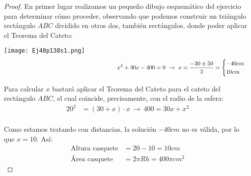\begin{proof} En primer lugar realizamos un pequeño dibujo esquemático del ejercicio para determinar cómo proceder, observando que podemos construir un triángulo rectángulo $ABC$ dividido en otros dos, también rectángulos, donde poder aplicar el Teorema del Cateto:

\begin{multicols}{2}
		
		\begin{center}
		\texttt{[image: Ej40p138s1.png]}
		\vspace{-2cm}
		\begin{align*}
				\hspace{6.85cm}x^2&+30x-400=0 \ \rightarrow \ x=\dfrac{-30\pm50}{2}=\begin{cases}-40cm\\ 10cm\end{cases}\\
			\end{align*}
	\end{center}
				
	\columnbreak
	
	\begin{minipage}{7cm}
			Para calcular $x$ bastará aplicar el Teorema del Cateto para el cateto del rectángulo $ABC$, el cual coincide, precisamente, con el radio de la esfera:
			\begin{align*}
				20^2&=(30+x)\cdot x \ \rightarrow \ 400=30x+x^2\\
			\end{align*}	
			
		\end{minipage}
	
	\end{multicols}
	Como estamos tratando con distancias, la solución $-40cm$ no es válida, por lo que $x=10$. Así:
			\begin{align*}
				\text{Altura casquete}&=20-10=10cm\\
				\text{Área casquete}&=2\pi Rh=400\pi cm^2
			\end{align*}	
\end{proof}

